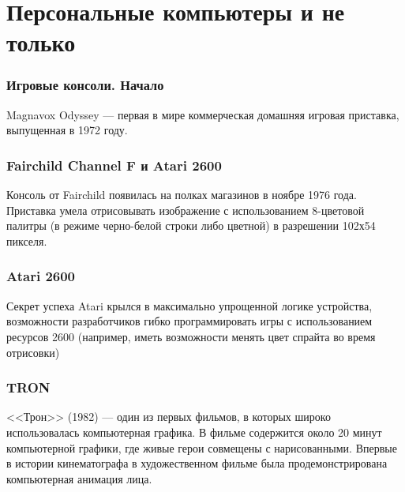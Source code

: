 \documentclass[10pt]{beamer}
\begin{document}
\section{Персональные компьютеры и не только}
\frame {\sectionpage}

\begin{frame}\frametitle{Игровые консоли. Начало}{

Magnavox Odyssey — первая в мире коммерческая домашняя игровая приставка, выпущенная в 1972 году.



{
}
{
}


}\end{frame}

\begin{frame}\frametitle{Fairchild Channel F и Atari 2600}{
	
	Консоль от Fairchild появилась на полках магазинов в ноябре 1976 года.  Приставка умела отрисовывать изображение с использованием 8-цветовой палитры (в режиме черно-белой строки либо цветной) в разрешении 102х54 пикселя.	
}\end{frame}

\begin{frame}\frametitle{Atari 2600}{
	{
		\vspace{-1em}
	}
	{
		Секрет успеха Atari крылся в максимально упрощенной логике устройства, возможности разработчиков гибко программировать игры с использованием ресурсов 2600 (например, иметь возможности менять цвет спрайта во время отрисовки)
		
		\hfill
		
		\footnotesize{}
	}
}\end{frame}

\begin{frame}\frametitle {TRON}
{
	{
		
	}
	{
		<<Трон>> (1982) — один из первых фильмов, в которых широко использовалась компьютерная графика. В фильме содержится около 20 минут компьютерной графики, где живые герои совмещены с нарисованными. Впервые в истории кинематографа в художественном фильме была продемонстрирована компьютерная анимация лица.
		
		\hfill
		
		\footnotesize{}
		\footnotesize{}
	}
	
	
	
}\end{frame}
\end{document}
